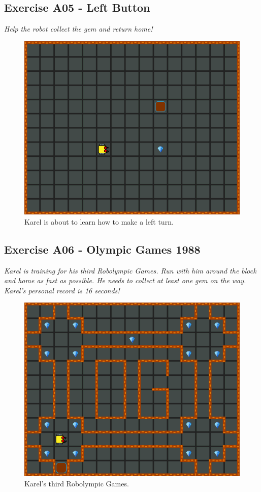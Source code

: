 \documentclass[article,A4,12pt]{llncs}
\begin{document}
\subsection{Exercise A05 - Left Button}

{\em Help the robot collect the gem and return home!}

\begin{figure}[!ht]
\begin{center}
\includegraphics[height=0.4\textwidth]{img/a05.png}
\end{center}
\vspace{-4mm}
\caption{Karel is about to learn how to make a left turn.}
\label{fig:a05}
\vspace{-1cm}
\end{figure}
\noindent

\newpage

\subsection{Exercise A06 - Olympic Games 1988 }

{\em Karel is training for his third Robolympic Games. Run with him around the block and home as fast as possible. He needs to collect at least one gem on the way. Karel's personal record is 16 seconds!}

\begin{figure}[!ht]
\begin{center}
\includegraphics[height=0.4\textwidth]{img/a06.png}
\end{center}
\vspace{-4mm}
\caption{Karel's third Robolympic Games.}
\label{fig:a06}
\vspace{-1cm}
\end{figure}
\noindent
\end{document}

